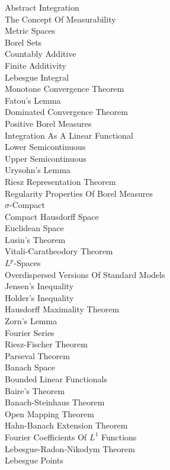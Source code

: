 Abstract Integration \\
The Concept Of Measurability \\
Metric Spaces \\
Borel Sets \\
Countably Additive \\
Finite Additivity \\
Lebesgue Integral \\
Monotone Convergence Theorem \\
Fatou's Lemma \\
Dominated Convergence Theorem \\
Positive Borel Measures \\
Integration As A Linear Functional \\
Lower Semicontinuous \\
Upper Semicontinuous \\
Urysohn's Lemma \\
Riesz Representation Theorem \\
Regularity Properties Of Borel Measures \\
$\sigma$-Compact \\
Compact Hausdorff Space \\
Euclidean Space \\
Lusin's Theorem \\
Vitali-Caratheodory Theorem \\
$L^p$-Spaces \\
Overdispersed Versions Of Standard Models \\
Jensen's Inequality \\
Holder's Inequality \\
Hausdorff Maximality Theorem \\
Zorn's Lemma \\
Fourier Series \\
Riesz-Fischer Theorem \\
Parseval Theorem \\
Banach Space \\
Bounded Linear Functionals \\
Baire's Theorem \\
Banach-Steinhaus Theorem \\
Open Mapping Theorem \\
Hahn-Banach Extension Theorem \\
Fourier Coefficients Of $L^1$ Functions \\
Lebesgue-Radon-Nikodym Theorem \\
Lebesgue Points \\
